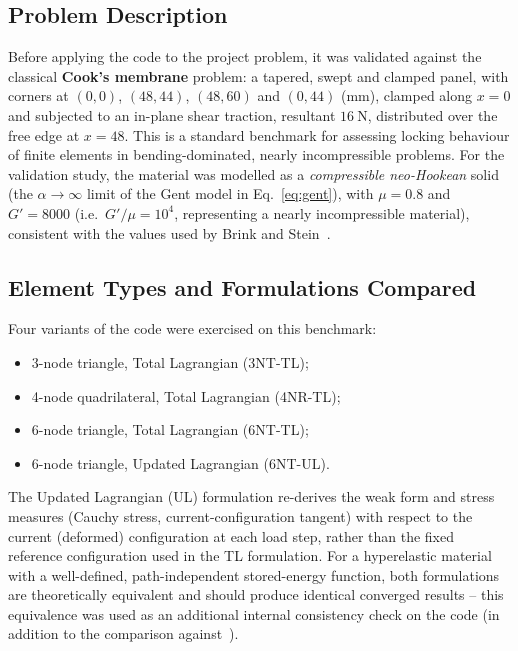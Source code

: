 \documentclass[11pt,a4paper]{article}
\begin{document}
\subsection{Problem Description}
Before applying the code to the project problem, it was validated against the classical
\textbf{Cook's membrane} problem: a tapered, swept and clamped panel, with corners at
$(0,0)$, $(48,44)$, $(48,60)$ and $(0,44)$ (mm), clamped along $x=0$ and subjected to an in-plane shear
traction, resultant $16\ \text{N}$, distributed over the free edge at $x=48$. This is a standard
benchmark for assessing locking behaviour of finite elements in bending-dominated, nearly incompressible
problems. For the validation study, the material was modelled as a \emph{compressible neo-Hookean} solid
(the $\alpha\to\infty$ limit of the Gent model in Eq.~\eqref{eq:gent}), with $\mu = 0.8$ and
$G' = 8000$ (i.e.\ $G'/\mu = 10^{4}$, representing a nearly incompressible material), consistent with the
values used by Brink and Stein~\cite{brinkstein1996}.

\subsection{Element Types and Formulations Compared}
Four variants of the code were exercised on this benchmark:
\begin{itemize}
    \item 3-node triangle, Total Lagrangian (3NT-TL);
    \item 4-node quadrilateral, Total Lagrangian (4NR-TL);
    \item 6-node triangle, Total Lagrangian (6NT-TL);
    \item 6-node triangle, Updated Lagrangian (6NT-UL).
\end{itemize}
The Updated Lagrangian (UL) formulation re-derives the weak form and stress measures (Cauchy stress,
current-configuration tangent) with respect to the current (deformed) configuration at each load step,
rather than the fixed reference configuration used in the TL formulation. For a hyperelastic material with
a well-defined, path-independent stored-energy function, both formulations are theoretically equivalent
and should produce identical converged results -- this equivalence was used as an additional internal
consistency check on the code (in addition to the comparison against~\cite{brinkstein1996}).
\end{document}
